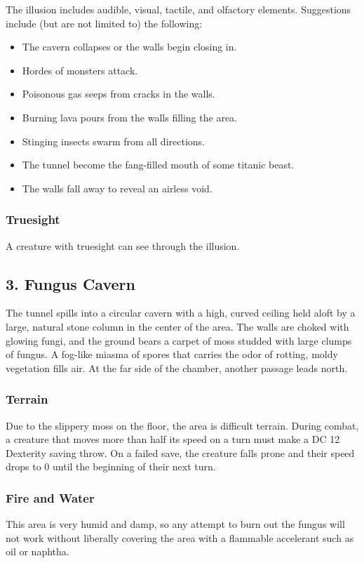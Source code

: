 \documentclass[10pt,a4paper,twoside,bg=print,twocolumn,openany,nodeprecatedcode]{dndbook}
\begin{document}
The illusion includes audible, visual, tactile, and olfactory elements. Suggestions include (but are not limited to) the following:


\begin{itemize}
\item The cavern collapses or the walls begin closing in.
\item Hordes of monsters attack.
\item Poisonous gas seeps from cracks in the walls.
\item Burning lava pours from the walls filling the area.
\item Stinging insects swarm from all directions.
\item The tunnel become the fang-filled mouth of some titanic beast.
\item The walls fall away to reveal an airless void.
\end{itemize}

\subsubsection{Truesight}
A creature with truesight can see through the illusion.

\subsection{3. Fungus Cavern}
\begin{DndReadAloud}{}
The tunnel spills into a circular cavern with a high, curved ceiling held aloft by a large, natural stone column in the center of the area. The walls are choked with glowing fungi, and the ground bears a carpet of moss studded with large clumps of fungus. A fog-like miasma of spores that carries the odor of rotting, moldy vegetation fills air. At the far side of the chamber, another passage leads north.

\end{DndReadAloud}

\subsubsection{Terrain}
Due to the slippery moss on the floor, the area is difficult terrain. During combat, a creature that moves more than half its speed on a turn must make a DC 12 Dexterity saving throw. On a failed save, the creature falls prone and their speed drops to 0 until the beginning of their next turn.

\subsubsection{Fire and Water}
This area is very humid and damp, so any attempt to burn out the fungus will not work without liberally covering the area with a flammable accelerant such as oil or naphtha.
\end{document}
